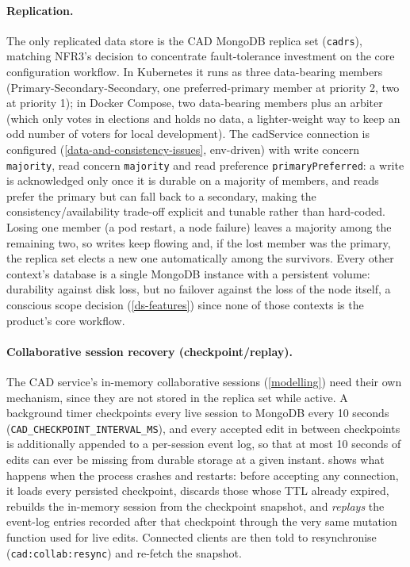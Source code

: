 \paragraph{Replication.} The only replicated data store is the CAD MongoDB
replica set (\texttt{cadrs}), matching NFR3's decision to concentrate
fault-tolerance investment on the core configuration workflow.
In Kubernetes it runs as three
data-bearing members (Primary-Secondary-Secondary, one preferred-primary
member at priority 2, two at priority 1); in Docker Compose, two data-bearing
members plus an arbiter (which only votes in elections and holds no data, a
lighter-weight way to keep an odd number of voters for local development). The
cadService connection is configured (\cref{data-and-consistency-issues},
env-driven) with write concern \texttt{majority}, read concern
\texttt{majority} and read preference \texttt{primaryPreferred}: a write is
acknowledged only once it is durable on a majority of members, and reads
prefer the primary but can fall back to a secondary, making the
consistency/availability trade-off explicit and tunable rather than hard-coded.
Losing one member (a pod restart, a node failure) leaves a majority among the
remaining two, so writes keep flowing and, if the lost member was the
primary, the replica set elects a new one automatically among the survivors. 
Every other context's database is a
single MongoDB instance with a persistent volume: durability against disk
loss, but no failover against the loss of the node itself, a conscious
scope decision (\cref{ds-features}) since none of those contexts is the
product's core workflow.

\paragraph{Collaborative session recovery (checkpoint/replay).} The CAD
service's in-memory collaborative sessions (\cref{modelling}) need their own
mechanism, since they are not stored in the replica set while active. A
background timer checkpoints every live session to MongoDB every 10 seconds
(\texttt{CAD\_CHECKPOINT\_INTERVAL\_MS}), and every accepted edit in between
checkpoints is additionally appended to a per-session event log, so that at
most 10 seconds of edits can ever be missing from durable storage at a given
instant.  shows what happens when the process crashes and
restarts: before accepting any connection, it loads every persisted
checkpoint, discards those whose TTL already expired, rebuilds the in-memory
session from the checkpoint snapshot, and \emph{replays} the event-log entries
recorded after that checkpoint through the very same mutation function used
for live edits. Connected clients are
then told to resynchronise (\texttt{cad:collab:resync}) and re-fetch the
snapshot.

